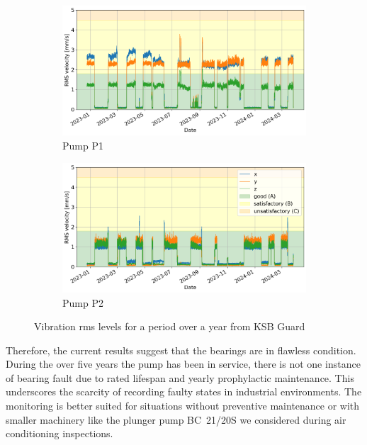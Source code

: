 \begin{figure}[h]
    \centering
    \begin{subfigure}[b]{0.49\textwidth}
        \includegraphics[width=\textwidth]{assets/results/ksb-cloud/p1.png}
        \caption{Pump P1}
    \end{subfigure}
    \hfill
    \begin{subfigure}[b]{0.49\textwidth}
        \includegraphics[width=\textwidth]{assets/results/ksb-cloud/p2.png}
        \caption{Pump P2}
    \end{subfigure}
    \caption{Vibration rms levels for a period over a year from KSB Guard}
    \label{fig:evaluation:ksb-guard-rms-vibartions}
\end{figure} 

Therefore, the current results suggest that the bearings are in flawless condition. During the over five years the pump has been in service, there is not one instance of bearing fault due to rated lifespan and yearly prophylactic maintenance. This underscores the scarcity of recording faulty states in industrial environments. The monitoring is better suited for situations without preventive maintenance or with smaller machinery like the plunger pump BC~21/20S we considered during air conditioning inspections.


